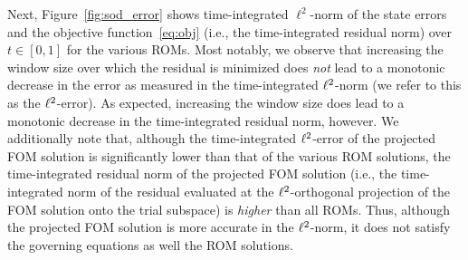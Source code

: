 Next, Figure~\ref{fig:sod_error} shows time-integrated $\ell^2$-norm of the state errors and the objective function~\eqref{eq:obj} (i.e., the time-integrated residual norm) over $t \in [0,1]$ for the various ROMs. Most notably, we observe 
that increasing the window size over which the residual is minimized does \textit{not} lead to a monotonic decrease in the error as measured in the time-integrated $\ell^2$-norm (we refer to this as the $\ell^2$-error). As expected, increasing the window size does lead to a monotonic decrease in the time-integrated residual norm, however. We additionally note that, although the time-integrated $\ell^2$-error of 
the projected FOM solution is significantly lower than that of the various ROM solutions, the time-integrated residual norm of the projected FOM solution (i.e., the time-integrated norm of the residual evaluated at the $\ell^2$-orthogonal projection of the FOM solution onto the trial subspace) is \textit{higher} 
than all ROMs. Thus, although the projected FOM solution is more accurate in the $\ell^2$-norm, it does not satisfy the governing equations as well the ROM solutions. 

